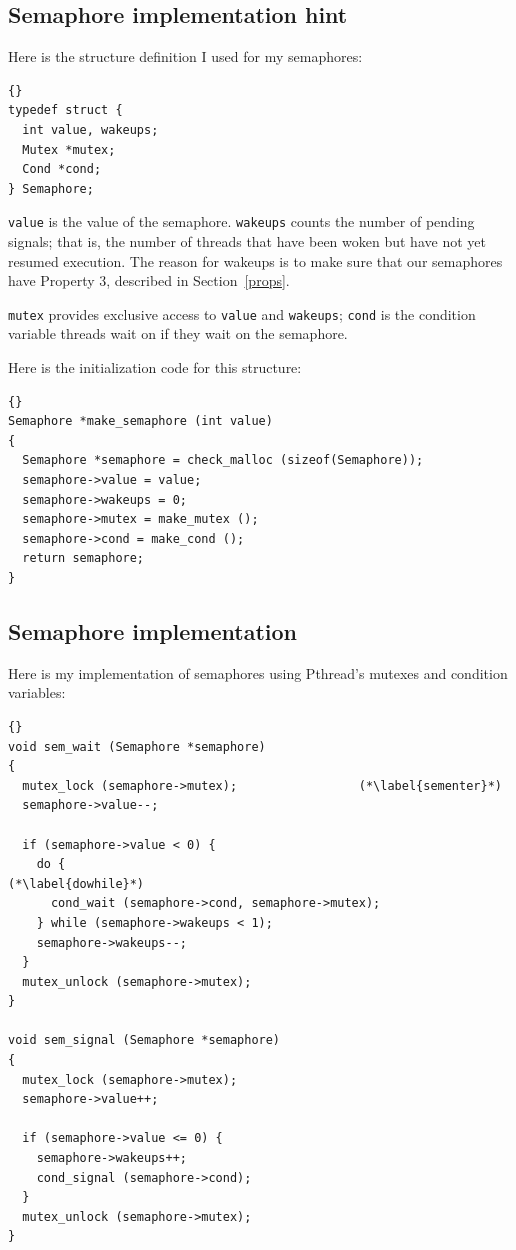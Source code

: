 \documentclass{book}
\newcommand{\clearemptydoublepage}{\newpage\cleardoublepage}
\begin{document}
\clearemptydoublepage
\subsection{Semaphore implementation hint}

Here is the structure definition I used for my semaphores:

\begin{latin}
\begin{lstlisting}[title={}]{}
typedef struct {
  int value, wakeups;
  Mutex *mutex;
  Cond *cond;
} Semaphore;
\end{lstlisting}
\end{latin}

{\tt value} is the value of the semaphore.  {\tt wakeups} counts
the number of pending signals; that is, the number of threads
that have been woken but have not yet resumed execution.  The reason
for wakeups is to make sure that our semaphores have
Property 3, described in Section~\ref{props}.

{\tt mutex} provides exclusive access to {\tt value} and
{\tt wakeups}; {\tt cond} is the condition variable threads
wait on if they wait on the semaphore.

Here is the initialization code for this structure:

\begin{latin}
\begin{lstlisting}[title={}]{}
Semaphore *make_semaphore (int value)
{
  Semaphore *semaphore = check_malloc (sizeof(Semaphore));
  semaphore->value = value;
  semaphore->wakeups = 0;
  semaphore->mutex = make_mutex ();
  semaphore->cond = make_cond ();
  return semaphore;
}
\end{lstlisting}
\end{latin}


\clearemptydoublepage
\subsection{Semaphore implementation}

Here is my implementation of semaphores using Pthread's mutexes
and condition variables:

\begin{latin}
\begin{lstlisting}[title={}]{}
void sem_wait (Semaphore *semaphore)
{
  mutex_lock (semaphore->mutex);                 (*\label{sementer}*)
  semaphore->value--;

  if (semaphore->value < 0) {
    do {                                                (*\label{dowhile}*)
      cond_wait (semaphore->cond, semaphore->mutex);
    } while (semaphore->wakeups < 1);
    semaphore->wakeups--;
  }
  mutex_unlock (semaphore->mutex);
}

void sem_signal (Semaphore *semaphore)
{
  mutex_lock (semaphore->mutex);
  semaphore->value++;

  if (semaphore->value <= 0) {
    semaphore->wakeups++;
    cond_signal (semaphore->cond);
  }
  mutex_unlock (semaphore->mutex);
}
\end{lstlisting}
\end{latin}
\end{document}
